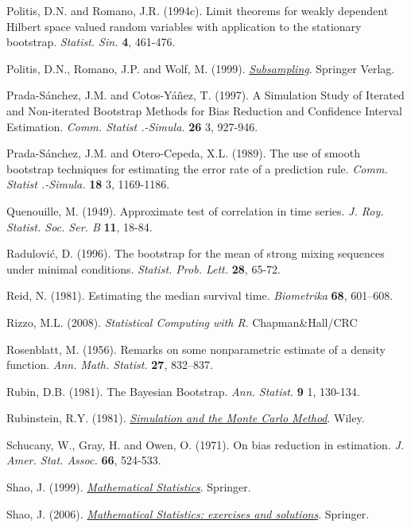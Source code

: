 \documentclass[
]{book}
\theoremstyle{definition}
\theoremstyle{definition}
\theoremstyle{definition}
\theoremstyle{remark}
\begin{document}
Politis, D.N. and Romano, J.R. (1994c). Limit theorems for weakly
dependent Hilbert space valued random variables with application to the
stationary bootstrap. \emph{Statist. Sin.} \textbf{4}, 461-476.

Politis, D.N., Romano, J.P. and Wolf, M. (1999). \href{https://books.google.es/books?hl=es\&lr=\&id=nGu6rqjE6JoC\&oi=fnd\&pg=PR7\&dq=Subsampling}{\emph{Subsampling}}.
Springer Verlag.

Prada-Sánchez, J.M. and Cotos-Yáñez, T. (1997). A Simulation Study of
Iterated and Non-iterated Bootstrap Methods for Bias Reduction and
Confidence Interval Estimation. \emph{Comm. Statist .-Simula.} \textbf{26} 3, 927-946.

Prada-Sánchez, J.M. and Otero-Cepeda, X.L. (1989). The use of smooth
bootstrap techniques for estimating the error rate of a prediction rule.
\emph{Comm. Statist .-Simula.} \textbf{18} 3, 1169-1186.

Quenouille, M. (1949). Approximate test of correlation in time series.
\emph{J. Roy. Statist. Soc. Ser. B} \textbf{11}, 18-84.

Radulović, D. (1996). The bootstrap for the mean of strong mixing
sequences under minimal conditions. \emph{Statist. Prob. Lett.} \textbf{28},
65-72.

Reid, N. (1981). Estimating the median survival time. \emph{Biometrika}
\textbf{68}, 601--608.

Rizzo, M.L. (2008). \emph{Statistical Computing with R}. Chapman\&Hall/CRC

Rosenblatt, M. (1956). Remarks on some nonparametric estimate of a
density function. \emph{Ann. Math. Statist.} \textbf{27}, 832--837.

Rubin, D.B. (1981). The Bayesian Bootstrap. \emph{Ann. Statist.} \textbf{9} 1,
130-134.

Rubinstein, R.Y. (1981). \href{https://books.google.es/books?hl=es\&lr=\&id=r2VODQAAQBAJ\&oi=fnd\&pg=PR1\&dq=Simulation+and+the+Monte+Carlo+Method}{\emph{Simulation and the Monte Carlo Method}}. Wiley.

Schucany, W., Gray, H. and Owen, O. (1971). On bias reduction in
estimation. \emph{J. Amer. Stat. Assoc.} \textbf{66}, 524-533.

Shao, J. (1999). \href{https://www.springer.com/gp/book/9780387953823}{\emph{Mathematical Statistics}}. Springer.

Shao, J. (2006). \href{http://www.stewartschultz.com/statistics/books/Mathematical\%20Statistics\%20-\%20Exercises\%20and\%20Solutions.pdf}{\emph{Mathematical Statistics: exercises and solutions}}. Springer.
\end{document}
